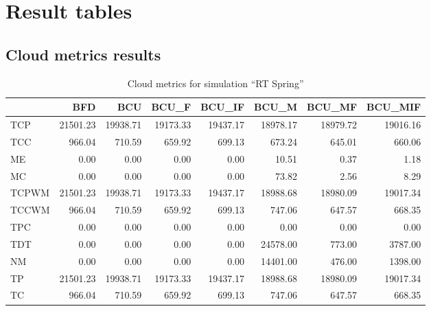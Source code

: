 

\section{Result tables}



\subsection{Cloud metrics results}

\begin{table}[ht]
\centering
\begin{tabular}{lrrrrrrr}
\toprule
{} &       BFD &       BCU &     BCU\_F &    BCU\_IF &     BCU\_M &    BCU\_MF &   BCU\_MIF \\
\midrule
TCP   &  21501.23 &  19938.71 &  19173.33 &  19437.17 &  18978.17 &  18979.72 &  19016.16 \\
TCC   &    966.04 &    710.59 &    659.92 &    699.13 &    673.24 &    645.01 &    660.06 \\
ME    &      0.00 &      0.00 &      0.00 &      0.00 &     10.51 &      0.37 &      1.18 \\
MC    &      0.00 &      0.00 &      0.00 &      0.00 &     73.82 &      2.56 &      8.29 \\
TCPWM &  21501.23 &  19938.71 &  19173.33 &  19437.17 &  18988.68 &  18980.09 &  19017.34 \\
TCCWM &    966.04 &    710.59 &    659.92 &    699.13 &    747.06 &    647.57 &    668.35 \\
TPC   &      0.00 &      0.00 &      0.00 &      0.00 &      0.00 &      0.00 &      0.00 \\
TDT   &      0.00 &      0.00 &      0.00 &      0.00 &  24578.00 &    773.00 &   3787.00 \\
NM    &      0.00 &      0.00 &      0.00 &      0.00 &  14401.00 &    476.00 &   1398.00 \\
TP    &  21501.23 &  19938.71 &  19173.33 &  19437.17 &  18988.68 &  18980.09 &  19017.34 \\
TC    &    966.04 &    710.59 &    659.92 &    699.13 &    747.06 &    647.57 &    668.35 \\
\bottomrule
\end{tabular}
\caption{Cloud metrics for simulation "`RT Spring"'}
\end{table}


